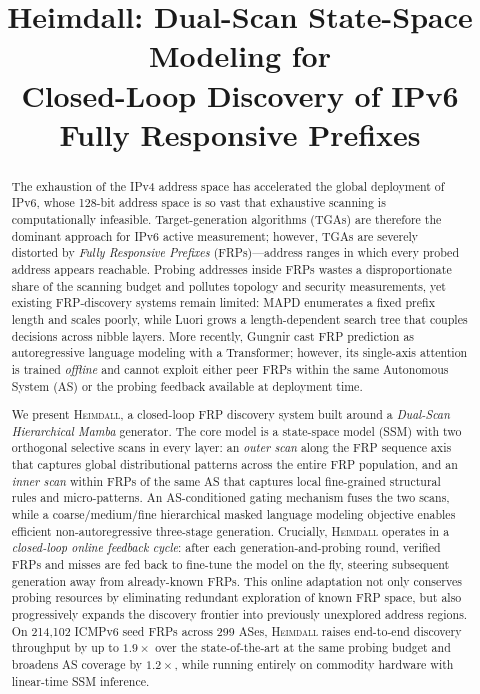 \documentclass[conference]{IEEEtran}
\begin{document}
\title{Heimdall: Dual-Scan State-Space Modeling for\\
       Closed-Loop Discovery of IPv6 Fully Responsive Prefixes}

\author{
}

\maketitle

\begin{abstract}
The exhaustion of the IPv4 address space has accelerated the global
deployment of IPv6, whose 128-bit address space is so vast that exhaustive
scanning is computationally infeasible.  Target-generation algorithms
(TGAs) are therefore the dominant approach for IPv6 active measurement;
however, TGAs are severely distorted by \emph{Fully Responsive Prefixes}
(FRPs)---address ranges in which every probed address appears reachable.
Probing addresses inside FRPs wastes a disproportionate share of the
scanning budget and pollutes topology and security measurements, yet
existing FRP-discovery systems remain limited: MAPD enumerates a fixed
prefix length and scales poorly, while Luori grows a length-dependent
search tree that couples decisions across nibble layers.  More recently,
Gungnir cast FRP prediction as autoregressive language modeling with a
Transformer; however, its single-axis attention is trained \emph{offline}
and cannot exploit either peer FRPs within the same Autonomous System (AS)
or the probing feedback available at deployment time.

We present \textsc{Heimdall}, a closed-loop FRP discovery system built
around a \emph{Dual-Scan Hierarchical Mamba} generator.  The core model
is a state-space model (SSM) with two orthogonal selective scans in every
layer: an \emph{outer scan} along the FRP sequence axis that captures
global distributional patterns across the entire FRP population, and an
\emph{inner scan} within FRPs of the same AS that captures local
fine-grained structural rules and micro-patterns.  An AS-conditioned
gating mechanism fuses the two scans, while a coarse/medium/fine
hierarchical masked language modeling objective enables efficient
non-autoregressive three-stage generation.  Crucially, \textsc{Heimdall}
operates in a \emph{closed-loop online feedback cycle}: after each
generation-and-probing round, verified FRPs and misses are fed back to
fine-tune the model on the fly, steering subsequent generation away from
already-known FRPs.  This online adaptation not only conserves probing
resources by eliminating redundant exploration of known FRP space, but
also progressively expands the discovery frontier into previously
unexplored address regions.  On 214,102 ICMPv6 seed FRPs across 299 ASes,
\textsc{Heimdall} raises end-to-end discovery throughput by up to
$1.9\times$ over the state-of-the-art at the same probing budget and
broadens AS coverage by $1.2\times$, while running entirely on commodity
hardware with linear-time SSM inference.
\end{abstract}
\end{document}
